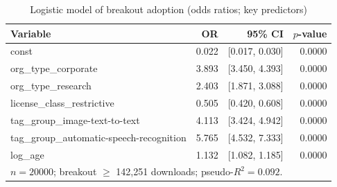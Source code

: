 \begin{table}[t]
\caption{Logistic model of breakout adoption (odds ratios; key predictors)}
\label{tab:logit}
\centering
\small
\begin{tabular}{lrrr}
\toprule
Variable & OR & 95\% CI & $p$-value \\
\midrule
const & 0.022 & [0.017, 0.030] & 0.0000 \\
org\_type\_corporate & 3.893 & [3.450, 4.393] & 0.0000 \\
org\_type\_research & 2.403 & [1.871, 3.088] & 0.0000 \\
license\_class\_restrictive & 0.505 & [0.420, 0.608] & 0.0000 \\
tag\_group\_image-text-to-text & 4.113 & [3.424, 4.942] & 0.0000 \\
tag\_group\_automatic-speech-recognition & 5.765 & [4.532, 7.333] & 0.0000 \\
log\_age & 1.132 & [1.082, 1.185] & 0.0000 \\
\bottomrule
\multicolumn{4}{l}{$n=20000$; breakout $\geq$ 142,251 downloads; pseudo-$R^2=0.092$.} \\
\end{tabular}
\normalsize
\end{table}
